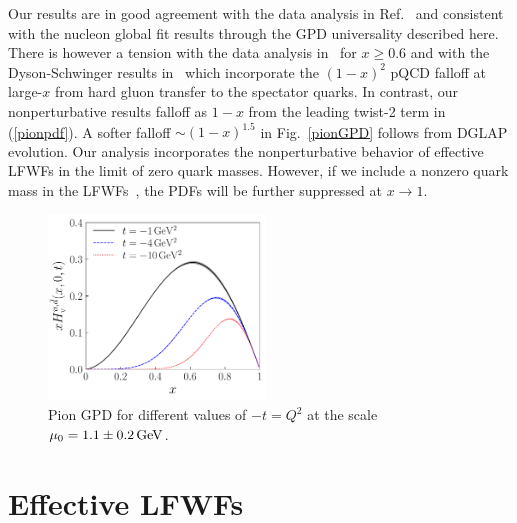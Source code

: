 \documentclass[aps,prl,reprint,groupedaddress, preprintnumbers]{revtex4-1}
\newcommand{\req}[1]{(\ref{#1})}
\begin{document}
Our results are in good agreement with the data analysis in Ref.~\cite{Wijesooriya:2005ir} and consistent with the nucleon global fit results through the GPD universality described here. There is however a tension with the data analysis in~\cite{Aicher:2010cb} for $x \ge 0.6$ and with the Dyson-Schwinger results in~\cite{Chen:2016sno}  which incorporate the $(1-x)^2$ pQCD  falloff at large-$x$  from hard gluon transfer to the spectator quarks. In contrast, our nonperturbative results falloff as $1-x$ from the leading  twist-2 term in \req{pionpdf}. A softer falloff $\sim (1-x)^{1.5}$ in Fig.~\ref{pionGPD} follows from  DGLAP evolution.   Our analysis incorporates the nonperturbative behavior of effective LFWFs in the limit of zero quark masses. However, if we include a nonzero quark mass in the LFWFs~\cite{Brodsky:2014yha, Chabysheva:2012fe, Li:2017mlw}, the PDFs will be further suppressed at $x \to 1$.
 



\begin{figure}[htbp] 
\begin{center} 
\includegraphics[width=5.8cm]{pion_gpd}
\setlength\abovecaptionskip{-4pt}
\setlength\belowcaptionskip{-6pt}
\caption{\label{piGPDs}  Pion GPD for different values of $- t =  Q^2$  at the scale $\mu_0=1.1\pm0.2\,\rm GeV$.}
\end{center}
\end{figure}

\section{Effective LFWFs}
\end{document}
